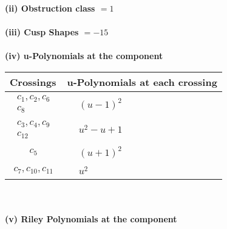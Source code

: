 \documentclass[1p]{elsarticle_modified}
\theoremstyle{definition}
\begin{document}
\flushleft \textbf{(ii) Obstruction class $= 1$}\\~\\
\flushleft \textbf{(iii) Cusp Shapes $= -15$}\\~\\
\newpage\renewcommand{\arraystretch}{1}
\flushleft \textbf{(iv) u-Polynomials at the component}\newline \\
\begin{tabular}{m{50pt}|m{274pt}}
Crossings & \hspace{64pt}u-Polynomials at each crossing \\
\hline $$\begin{aligned}c_{1},c_{2},c_{6}\\c_{8}\end{aligned}$$&$\begin{aligned}
&(u-1)^2
\end{aligned}$\\
\hline $$\begin{aligned}c_{3},c_{4},c_{9}\\c_{12}\end{aligned}$$&$\begin{aligned}
&u^2- u+1
\end{aligned}$\\
\hline $$\begin{aligned}c_{5}\end{aligned}$$&$\begin{aligned}
&(u+1)^2
\end{aligned}$\\
\hline $$\begin{aligned}c_{7},c_{10},c_{11}\end{aligned}$$&$\begin{aligned}
&u^2
\end{aligned}$\\
\hline
\end{tabular}\\~\\
\newpage\renewcommand{\arraystretch}{1}
\flushleft \textbf{(v) Riley Polynomials at the component}\newline \\
\end{document}
